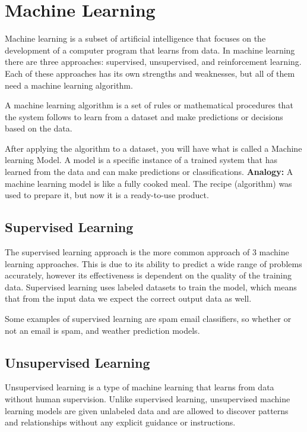 \section{Machine Learning}
\label{sec:Machine Learning}

Machine learning is a subset of artificial intelligence
that focuses on the development of a computer program that learns from data.
In machine learning there are three approaches: supervised, unsupervised, and reinforcement learning.
Each of these approaches has its own strengths and weaknesses, but all of them need a machine learning algorithm.

A machine learning algorithm is a set of rules or mathematical
procedures that the system follows to learn from a dataset
and make predictions or decisions based on the data.

After applying the algorithm to a dataset, you will have what is called a Machine learning Model.
A model is a specific instance of a trained system that has learned from the data and can make predictions or classifications.
\cite{ML-Models}
\textbf{Analogy:} A machine learning model is like a fully cooked meal.
The recipe (algorithm) was used to prepare it, but now it is a ready-to-use product.

\subsection{Supervised Learning}
The supervised learning approach is the more common approach of 3 machine learning approaches.
This is due to its ability to predict a wide range of problems accurately,
however its effectiveness is dependent on the quality of the training data.
Supervised learning uses labeled datasets to train the model,
which means that from the input data we expect the correct output data as well.
\cite{GoogleCloud-SL}

Some examples of supervised learning are spam email classifiers,
so whether or not an email is spam, and weather prediction models.

\subsection{Unsupervised Learning}
Unsupervised learning is a type of machine learning
that learns from data without human supervision. Unlike supervised learning,
unsupervised machine learning models are given unlabeled data and are allowed to discover patterns
and relationships without any explicit guidance or instructions. \cite{GoogleCloud-UL}

